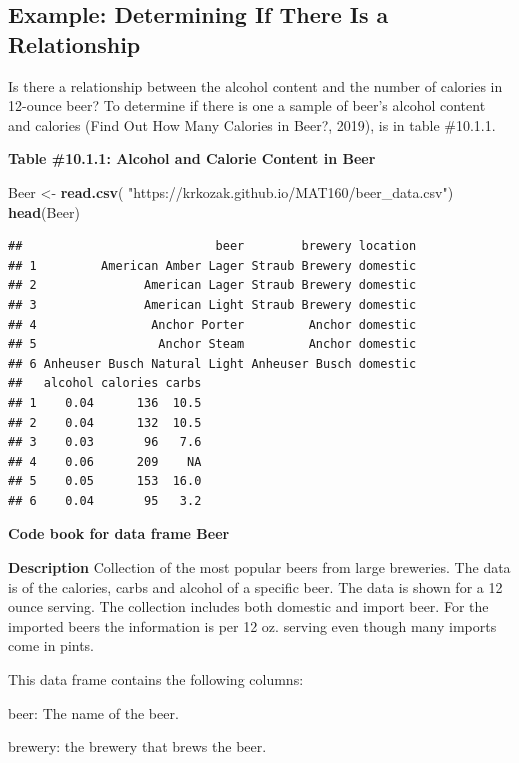 \documentclass[
]{book}
\newenvironment{Shaded}{\begin{snugshade}}{\end{snugshade}}
\newcommand{\KeywordTok}[1]{\textcolor[rgb]{0.13,0.29,0.53}{\textbf{#1}}}
\newcommand{\NormalTok}[1]{#1}
\newcommand{\StringTok}[1]{\textcolor[rgb]{0.31,0.60,0.02}{#1}}
\begin{document}
\hypertarget{example-determining-if-there-is-a-relationship}{%
\subsection{Example: Determining If There Is a Relationship}\label{example-determining-if-there-is-a-relationship}}

Is there a relationship between the alcohol content and the number of calories in 12-ounce beer? To determine if there is one a sample of beer's alcohol content and calories (Find Out How Many Calories in Beer?, 2019), is in table \#10.1.1.

\textbf{Table \#10.1.1: Alcohol and Calorie Content in Beer}

\begin{Shaded}
\begin{Highlighting}[]
\NormalTok{Beer <-}\StringTok{ }\KeywordTok{read.csv}\NormalTok{(}
  \StringTok{"https://krkozak.github.io/MAT160/beer_data.csv"}\NormalTok{)}
\KeywordTok{head}\NormalTok{(Beer)}
\end{Highlighting}
\end{Shaded}

\begin{verbatim}
##                           beer        brewery location
## 1         American Amber Lager Straub Brewery domestic
## 2               American Lager Straub Brewery domestic
## 3               American Light Straub Brewery domestic
## 4                Anchor Porter         Anchor domestic
## 5                 Anchor Steam         Anchor domestic
## 6 Anheuser Busch Natural Light Anheuser Busch domestic
##   alcohol calories carbs
## 1    0.04      136  10.5
## 2    0.04      132  10.5
## 3    0.03       96   7.6
## 4    0.06      209    NA
## 5    0.05      153  16.0
## 6    0.04       95   3.2
\end{verbatim}

\textbf{Code book for data frame Beer}

\textbf{Description}
Collection of the most popular beers from large breweries. The data is of the calories, carbs and alcohol of a specific beer. The data is shown for a 12 ounce serving. The collection includes both domestic and import beer. For the imported beers the information is per 12 oz. serving even though many imports come in pints.

This data frame contains the following columns:

beer: The name of the beer.

brewery: the brewery that brews the beer.
\end{document}
